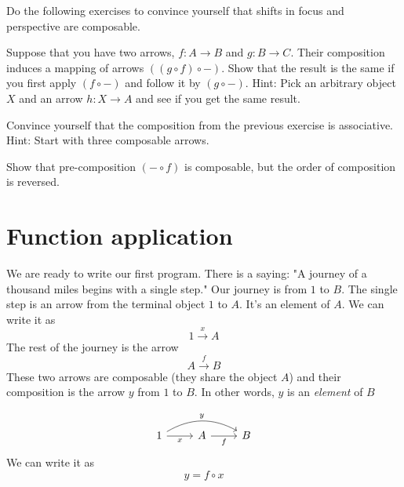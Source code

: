 \documentclass[DaoFP]{subfiles}
\begin{document}
Do the following exercises to convince yourself that shifts in focus and perspective are composable.
\begin{exercise}\label{ex-yoneda-composition}
Suppose that you have two arrows, $f \colon A \to B$ and $g \colon B \to C$. Their composition induces a mapping of arrows $((g \circ f) \circ -)$. Show that the result is the same if you first apply $(f \circ -)$ and follow it by $(g \circ -)$. Hint: Pick an arbitrary object $X$ and an arrow $h \colon X \to A$ and see if you get the same result. 
\end{exercise}

\begin{exercise}
Convince yourself that the composition from the previous exercise is associative. Hint: Start with three composable arrows.
\end{exercise}

\begin{exercise}
Show that pre-composition $(- \circ f)$ is composable, but the order of composition is reversed.
\end{exercise}

\section{Function application}

We are ready to write our first program. There is a saying: "A journey of a thousand miles begins with a single step." Our journey is from $1$ to $B$. The single step is an arrow from the terminal object $1$ to $A$. It's an element of $A$. We can write it as
\[1 \xrightarrow x A \]
The rest of the journey is the arrow 
\[A \xrightarrow f B\]
These two arrows are composable (they share the object $A$) and their composition is the arrow $y$ from $1$ to $B$. In other words, $y$ is an \emph{element} of $B$

\[
 \begin{tikzcd}
 1
 \arrow[rr, bend left, "y"]
 \arrow[r, "x"']
 & A
 \arrow[r, "f"']
& B
 \end{tikzcd}
\]
We can write it as
\[y = f \circ x \]
\end{document}
